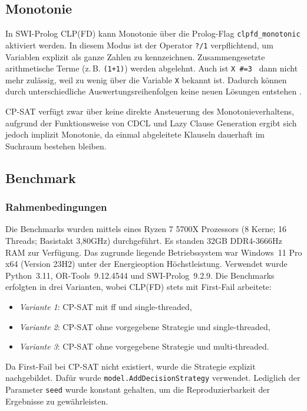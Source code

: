 \documentclass[12pt,a4paper]{article}
\begin{document}
\subsection{Monotonie}
\label{sec:monotonie}
In SWI-Prolog CLP(FD) kann Monotonie über die Prolog-Flag \texttt{clpfd\_monotonic} aktiviert werden.  
In diesem Modus ist der Operator \texttt{?/1} verpflichtend, um Variablen explizit als ganze Zahlen zu kennzeichnen.
Zusammengesetzte arithmetische Terme (z.\,B. \texttt{(1+1)}) werden abgelehnt.
Auch ist \texttt{X \#=3 } dann nicht mehr zulässig, weil zu wenig über die Variable \texttt{X} bekannt ist.   
Dadurch können durch unterschiedliche Auswertungsreihenfolgen keine neuen Lösungen entstehen \cite{swi-clpfd-doc}.

CP-SAT verfügt zwar über keine direkte Ansteuerung des Monotonieverhaltens, aufgrund der Funktionsweise von CDCL und Lazy Clause Generation ergibt sich jedoch implizit Monotonie, da einmal abgeleitete Klauseln dauerhaft im Suchraum bestehen bleiben.
\subsection{Benchmark}
\subsubsection{Rahmenbedingungen}
Die Benchmarks wurden mittels eines Ryzen 7 5700X Prozessors (8 Kerne; 16 Threads; Basistakt 3,80GHz) durchgeführt.
Es standen 32GB DDR4-3666Hz RAM zur Verfügung.
Das zugrunde liegende Betriebssystem war Windows~11 Pro x64 (Version 23H2) unter der Energieoption \glqq Höchstleistung\grqq.
Verwendet wurde Python~3.11, OR-Tools~9.12.4544 und SWI-Prolog~9.2.9.
\noindent
Die Benchmarks erfolgten in drei Varianten, wobei CLP(FD) stets mit First-Fail arbeitete:
\begin{itemize}
    \item \emph{Variante 1}: CP-SAT mit ff und single-threaded,
    \item \emph{Variante 2}: CP-SAT ohne vorgegebene Strategie und single-threaded,
    \item \emph{Variante 3}: CP-SAT ohne vorgegebene Strategie und multi-threaded.
\end{itemize}

Da First-Fail bei CP-SAT nicht existiert, wurde die Strategie explizit nachgebildet.
Dafür wurde \verb|model.AddDecisionStrategy| verwendet.
Lediglich der Parameter \texttt{seed} wurde konstant gehalten, um die Reproduzierbarkeit der Ergebnisse zu gewährleisten.
\end{document}
